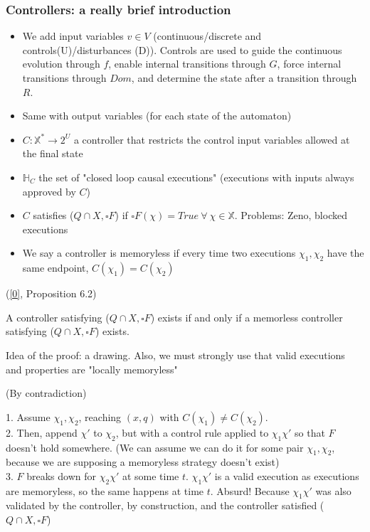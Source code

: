 \documentclass{beamer}
\begin{document}
\begin{frame}
	\frametitle{Controllers: a really brief introduction}
	
	
	
	\begin{itemize}
		\item We add input variables $v \in V$ (continuous/discrete and controls(U)/disturbances (D)). Controls are used to guide the continuous evolution through $f$, enable internal transitions through $G$, force internal transitions through $Dom$, and determine the state after a transition through $R$.
		\item Same with output variables (for each state of the automaton)
		\item $C : \mathbb{X}^* \rightarrow 2^U$ a controller that restricts the control input variables allowed at the final state
		\item $\mathbb{H}_C$ the set of "closed loop causal executions" (executions with inputs always approved by $C$)
		\item $C$ satisfies ($Q \cap X, \square F$) if $\square F(\chi) = True\ \forall\ \chi \in \mathbb{X}$. Problems: Zeno, blocked executions		
		\item We say a controller is memoryless if every time two executions $\chi_1,\chi_2$ have the same endpoint, $C(\chi_1) = C(\chi_2)$
	\end{itemize}
\end{frame}

\begin{frame}
(\href{https://pdfs.semanticscholar.org/6c3c/c35e9e723a586390244565cfa0081cc86f7e.pdf}{[0]}, Proposition 6.2) \newline
	
	
	A controller satisfying	 ($Q \cap X, \square F$) exists if and only if a memorless controller satisfying ($Q \cap X, \square F$) exists. \newline

Idea of the proof: a drawing. Also, we must strongly use that valid executions and properties are "locally memoryless"

(By contradiction)

1. Assume $\chi_1,\chi_2$, reaching $(x,q)$ with $C(\chi_1) \neq C(\chi_2)$.\\
2. Then, append $\chi'$ to $\chi_2$, but with a control rule applied to $\chi_1 \chi'$ so that $F$ doesn't hold somewhere. (We can assume we can do it for some pair $\chi_1,\chi_2$, because we are supposing a memoryless strategy doesn't exist)\\
3. $F$ breaks down for $\chi_2 \chi'$ at some time $t$. $\chi_1 \chi'$ is a valid execution as executions are memoryless, so the same happens at time $t$. Absurd! Because $\chi_1 \chi'$ was also validated by the controller, by construction, and the controller satisfied ($Q \cap X, \square F$)

\end{frame}
\end{document}
